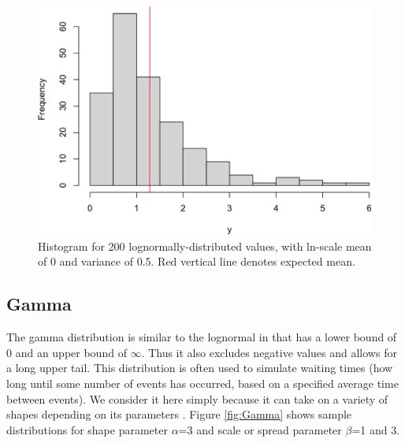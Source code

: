 \documentclass[
]{krantz}
\begin{document}
\begin{figure}
\includegraphics[width=0.9\linewidth]{bookdown_files/figure-latex/Lognormal-1} \caption{Histogram for 200 lognormally-distributed values, with ln-scale mean of 0 and variance of 0.5. Red vertical line denotes expected mean.}\label{fig:Lognormal}
\end{figure}

\hypertarget{GammaDist}{%
\subsection{Gamma}\label{GammaDist}}

The gamma distribution is similar to the lognormal in that has a lower bound of 0 and an upper bound of \(\infty\). Thus it also excludes negative values and allows for a long upper tail. This distribution is often used to simulate waiting times (how long until some number of events has occurred, based on a specified average time between events). We consider it here simply because it can take on a variety of shapes depending on its parameters \citep{bolker2008}. Figure \ref{fig:Gamma} shows sample distributions for shape parameter \(\alpha\)=3 and scale or spread parameter \(\beta\)=1 and 3.
\end{document}
